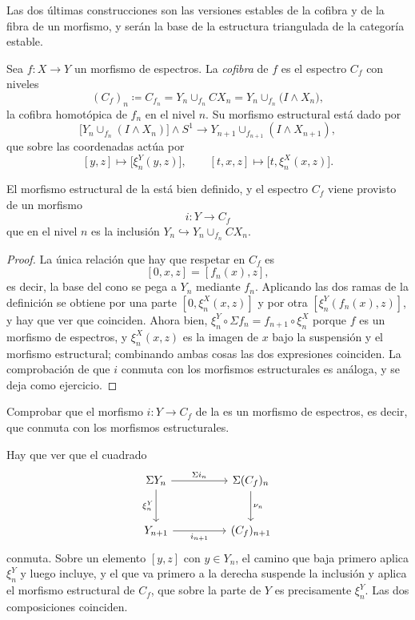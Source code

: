 Las dos últimas construcciones son las versiones estables de la cofibra y de la fibra de un morfismo, y serán la base de la estructura triangulada de la categoría estable.

\begin{defi}\label{defi:cofibra-espectros}
Sea $f\colon X\to Y$ un morfismo de espectros. La \emph{cofibra} de $f$ es el espectro $C_f$ con niveles
\[
(C_f)_n\coloneqq C_{f_n}=Y_n\cup_{f_n}CX_n=Y_n\cup_{f_n}\bigl(I\wedge X_n\bigr),
\]
la cofibra homotópica de $f_n$ en el nivel $n$. Su morfismo estructural está dado por
\[
\bigl[Y_n\cup_{f_n}(I\wedge X_n)\bigr]\wedge S^1\longrightarrow Y_{n+1}\cup_{f_{n+1}}(I\wedge X_{n+1}),
\]
que sobre las coordenadas actúa por
\[
[y,z]\longmapsto\bigl[\xi_n^Y(y,z)\bigr],
\qquad
[t,x,z]\longmapsto\bigl[t,\xi_n^X(x,z)\bigr].
\]
\end{defi}

\begin{prop}\label{prop:cofibra-bien-definida}
El morfismo estructural de la  está bien definido, y el espectro $C_f$ viene provisto de un morfismo
\[
i\colon Y\longrightarrow C_f
\]
que en el nivel $n$ es la inclusión $Y_n\hookrightarrow Y_n\cup_{f_n}CX_n$.
\end{prop}

\begin{proof}
La única relación que hay que respetar en $C_f$ es
\[
[0,x,z]=[f_n(x),z],
\]
es decir, la base del cono se pega a $Y_n$ mediante $f_n$. Aplicando las dos ramas de la definición se obtiene por una parte $[0,\xi_n^X(x,z)]$ y por otra $[\xi_n^Y(f_n(x),z)]$, y hay que ver que coinciden. Ahora bien, $\xi_n^Y\circ\Sigma f_n=f_{n+1}\circ\xi_n^X$ porque $f$ es un morfismo de espectros, y $\xi_n^X(x,z)$ es la imagen de $x$ bajo la suspensión y el morfismo estructural; combinando ambas cosas las dos expresiones coinciden. La comprobación de que $i$ conmuta con los morfismos estructurales es análoga, y se deja como ejercicio. \qedhere
\end{proof}

\begin{ejer}\label{ejer:i-es-morfismo}
Comprobar que el morfismo $i\colon Y\to C_f$ de la  es un morfismo de espectros, es decir, que conmuta con los morfismos estructurales.
\end{ejer}

\begin{sol}
Hay que ver que el cuadrado
\[
\begin{tikzcd}[column sep=huge, row sep=large]
\Sigma Y_n \arrow[r,"\Sigma i_n"] \arrow[d,"\xi_n^Y"'] & \Sigma (C_f)_n \arrow[d,"\nu_n"]\\
Y_{n+1} \arrow[r,"i_{n+1}"'] & (C_f)_{n+1}
\end{tikzcd}
\]
conmuta. Sobre un elemento $[y,z]$ con $y\in Y_n$, el camino que baja primero aplica $\xi_n^Y$ y luego incluye, y el que va primero a la derecha suspende la inclusión y aplica el morfismo estructural de $C_f$, que sobre la parte de $Y$ es precisamente $\xi_n^Y$. Las dos composiciones coinciden. \qedhere
\end{sol}

